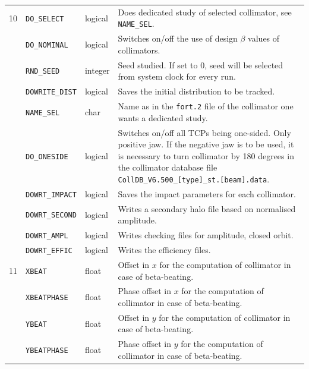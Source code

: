 \begin{center}
\begin{longtable}{| p{0.5cm} | p{2.4cm} | p{1.2cm} | >{\raggedright\arraybackslash}p{11.4cm}|}
    10  & \texttt{DO\_SELECT}    & logical & Does dedicated study of selected collimator, see \texttt{NAME\_SEL}. \\
        \cline{2-4}
        & \texttt{DO\_NOMINAL}   & logical & Switches on/off the use of design $\beta$ values of collimators. \\
        \cline{2-4}
        & \texttt{RND\_SEED}     & integer & Seed studied. If set to 0, seed will be selected from system clock for every run. \\
        \cline{2-4}
        & \texttt{DOWRITE\_DIST} & logical & Saves the initial distribution to be tracked. \\
        \cline{2-4}
        & \texttt{NAME\_SEL}     & char    & Name as in the \texttt{fort.2} file of the collimator one wants a dedicated study. \\
        \cline{2-4}
        & \texttt{DO\_ONESIDE}   & logical & Switches on/off all TCPs being one-sided. Only positive jaw. If the negative jaw is to be used, it is necessary to turn collimator by 180 degrees in the collimator database file \texttt{CollDB\_V6.500\_[type]\_st.[beam].data}. \\
        \cline{2-4}
        & \texttt{DOWRT\_IMPACT} & logical & Saves the impact parameters for each collimator. \\
        \cline{2-4}
        & \texttt{DOWRT\_SECOND} & logical & Writes a secondary halo file based on normalised amplitude. \\
        \cline{2-4}
        & \texttt{DOWRT\_AMPL}   & logical & Writes checking files for amplitude, closed orbit. \\
        \cline{2-4}
        & \texttt{DOWRT\_EFFIC}  & logical & Writes the efficiency files. \\
    \hline

    11  & \texttt{XBEAT}         & float   & Offset in $x$ for the computation of collimator in case of beta-beating\index{beta-beating}. \\
        \cline{2-4}
        & \texttt{XBEATPHASE}    & float   & Phase offset in $x$ for the computation of collimator in case of beta-beating\index{beta-beating}. \\
        \cline{2-4}
        & \texttt{YBEAT}         & float   & Offset in $y$ for the computation of collimator in case of beta-beating\index{beta-beating}. \\
        \cline{2-4}
        & \texttt{YBEATPHASE}    & float   & Phase offset in $y$ for the computation of collimator in case of beta-beating\index{beta-beating}. \\
    \hline


\end{longtable}
\end{center}
